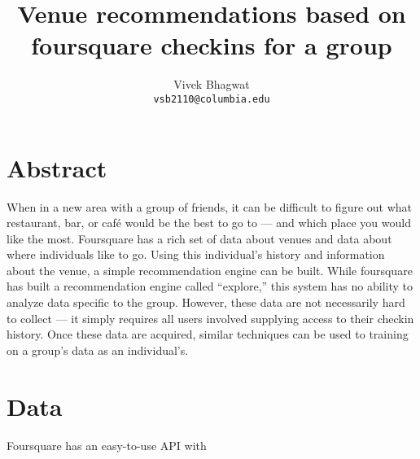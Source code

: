 \documentclass[11pt]{article}
\title{Venue recommendations based on foursquare checkins for a group}
\author{Vivek Bhagwat\\
{\tt vsb2110@columbia.edu}
}
\begin{document}
\maketitle

\section{Abstract}
When in a new area with a group of friends, it can be difficult to figure out what restaurant, bar, or caf\'e would be the best to go to ---
and which place you would like the most. Foursquare has a rich set of data about venues and data about where individuals like to go. 
Using this individual's history and information about the venue, a simple recommendation engine can be built. While foursquare 
has built a recommendation engine called ``explore,'' this system has no ability to analyze data specific to the group. However,
these data are not necessarily hard to collect --- it simply requires all users involved supplying access to their checkin history.
Once these data are acquired, similar techniques can be used to training on a group's data as an individual's.

\section{Data}
Foursquare has an easy-to-use API with 
\end{document}
